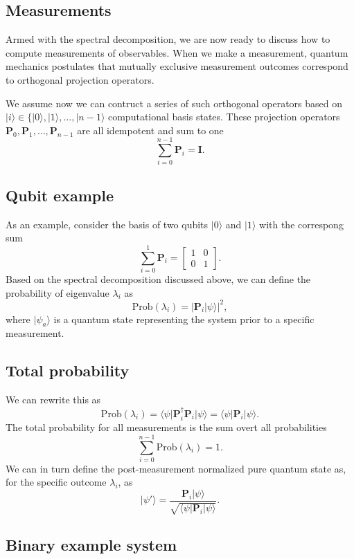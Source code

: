 \subsection{Measurements}

Armed with the spectral decomposition, we are now ready to discuss how
to compute measurements of observables.  When we make a measurement,
quantum mechanics postulates that mutually exclusive measurement
outcomes correspond to orthogonal projection operators.

We assume now we can contruct a series of such orthogonal operators based on $\vert i \rangle \in \{\vert 0\rangle, \vert 1\rangle,\dots, \vert n-1\rangle$ computational basis states. These projection operators $\bm{P}_0,\bm{P}_1,\dots,\bm{P}_{n-1}$ are all idempotent and sum to one
\[
\sum_{i=0}^{n-1}\bm{P}_i=\bm{I}.
\]

\subsection{Qubit example}

As an example, consider the basis of two qubits $\vert 0\rangle$ and $\vert 1\rangle$ with the correspong sum
\[
\sum_{i=0}^{1}\bm{P}_i=\begin{bmatrix} 1 & 0 \\ 0 & 1\end{bmatrix}.
\]
Based on the spectral decomposition discussed above, we can define the probability of eigenvalue $\lambda_i$ as
\[
\mathrm{Prob}(\lambda_i) = \vert \bm{P}_i\vert \psi\rangle\vert^2,
\]
where $\vert \psi_a\rangle$ is a quantum state representing the system prior to a specific measurement.

\subsection{Total probability}

We can rewrite this as 
\[
\mathrm{Prob}(\lambda_i) = \langle \psi\vert \bm{P}_i^{\dagger}\bm{P}_i\vert \psi\rangle =\langle \psi\vert \bm{P}_i\vert \psi\rangle.
\]
The total probability for all measurements is the sum overt all probabilities
\[
\sum_{i=0}^{n-1}\mathrm{Prob}(\lambda_i)=1.
\]
We can in turn define the post-measurement normalized pure quantum state as, for the specific outcome $\lambda_i$, as
\[
\vert \psi'\rangle = \frac{\bm{P}_i\vert \psi\rangle}{\sqrt{\langle \psi \vert \bm{P}_i\vert \psi\rangle}}. 
\]

\subsection{Binary example system}

